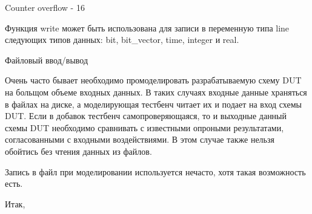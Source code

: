 Counter overflow - 16

Функция write может быть использована для записи в переменную типа line следующих типов данных: bit, bit_vector, time, integer и real.



Файловый ввод/вывод

Очень часто бывает необходимо промоделировать разрабатываемую схему DUT на больщом объеме входных данных. В таких случаях входные данные храняться в файлах на диске, а моделирующая тестбенч читает их и подает на вход схемы DUT. Если в добавок тестбенч самопроверяющаяся, то и выходные данный схемы DUT необходимо сравнивать с известными опроными результатами, согласованными с входными воздействиями. В этом случае также нельзя обойтись без чтения данных из файлов.

Запись в файл при моделировании используется нечасто, хотя такая возможность есть. 

Итак, 